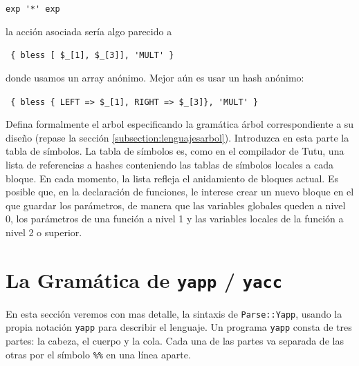 \begin{enumerate}
\begin{center}
\verb|exp '*' exp|
\end{center}

la acción asociada sería algo parecido a 

\begin{center}
\verb| { bless [ $_[1], $_[3]], 'MULT' } |
\end{center}

donde usamos un array anónimo. Mejor aún es usar un hash anónimo:

\begin{center}
\verb| { bless { LEFT => $_[1], RIGHT => $_[3]}, 'MULT' } |
\end{center}

Defina formalmente el arbol especificando la gramática árbol correspondiente a su diseño
(repase la sección \ref{subsection:lenguajesarbol}).
Introduzca en esta parte la tabla de símbolos.
La tabla de símbolos es, como en el compilador de Tutu, una lista 
de referencias a hashes conteniendo las tablas de símbolos locales a 
cada bloque.  En cada momento, la lista refleja el anidamiento de bloques 
actual. Es posible que, en la declaración 
de funciones, le interese crear un nuevo bloque en el que guardar los parámetros,
de manera que las variables globales queden a nivel 0, los parámetros 
de una función a nivel 1 y las variables locales de la función a nivel 2
o superior.
\end{enumerate}




\section{La Gramática de {\tt yapp} / {\tt yacc}}
En esta sección veremos con mas detalle, la sintaxis de \verb|Parse::Yapp|,
usando la propia notación \verb|yapp| para describir el lenguaje.
Un programa \verb|yapp| consta de tres partes:
la cabeza, el cuerpo y la cola. Cada una de las partes
va separada de las otras por el símbolo \verb|%%| en una
línea aparte.


